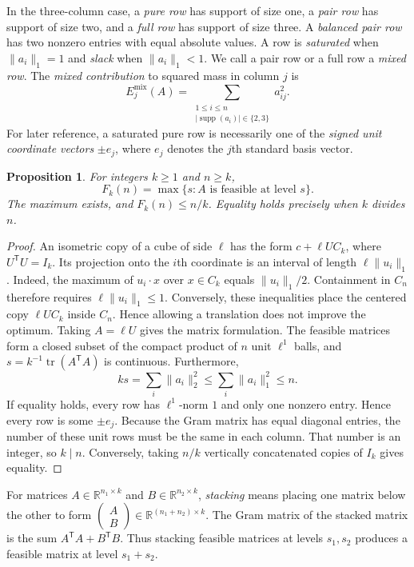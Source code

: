 \documentclass[11pt]{article}
\numberwithin{equation}{section}
\newtheorem{proposition}[proposition]{Proposition}
\theoremstyle{definition}
\theoremstyle{definition}
\newcommand{\R}{\mathbb R}
\newcommand{\norm}[1]{\lVert#1\rVert}
\DeclareMathOperator{\tr}{tr}
\DeclareMathOperator{\supp}{supp}
\begin{document}
In the three-column case, a \emph{pure row} has support of size one,
a \emph{pair row} has support of size two, and a \emph{full row}
has support of size three. A \emph{balanced pair row} has two
nonzero entries with equal absolute values. A row is
\emph{saturated} when $\|a_i\|_1=1$ and \emph{slack} when
$\|a_i\|_1<1$. We call a pair row or a full row a \emph{mixed row}.
The \emph{mixed contribution} to squared mass in column $j$ is
\[
 E_j^{\mathrm{mix}}(A)=
 \sum_{\substack{1\le i\le n\\|\supp(a_i)|\in\{2,3\}}}a_{ij}^2.
\]
For later reference, a saturated pure row is necessarily one of the
\emph{signed unit coordinate vectors} $\pm e_j$, where $e_j$ denotes
the $j$th standard basis vector.

\begin{proposition}\label{prop:matrix-model}
For integers $k\ge1$ and $n\ge k$,
\[
 F_k(n)=\max\{s:A\text{ is feasible at level }s\}.
\]
The maximum exists, and $F_k(n)\le n/k$. Equality holds precisely when
$k$ divides $n$.
\end{proposition}
\begin{proof}
An isometric copy of a cube of side $\ell$ has the form
$c+\ell U C_k$, where $U^{\mathsf T}U=I_k$.  Its projection onto the
$i$th coordinate is an interval of length $\ell\norm{u_i}_1$.
Indeed, the maximum of $u_i\cdot x$ over $x\in C_k$ equals
$\norm{u_i}_1/2$.  Containment in $C_n$ therefore requires
$\ell\norm{u_i}_1\le1$.  Conversely, these inequalities place the
centered copy $\ell U C_k$ inside $C_n$.  Hence allowing a translation
does not improve the optimum.  Taking $A=\ell U$ gives the matrix
formulation.
The feasible matrices form a closed subset of the compact product of
$n$ unit $\ell^1$ balls, and $s=k^{-1}\tr(A^{\mathsf T}A)$ is continuous.
Furthermore,
\[
 ks=\sum_i\norm{a_i}_2^2\le\sum_i\norm{a_i}_1^2\le n.
\]
If equality holds, every row has $\ell^1$-norm $1$ and only one nonzero
entry. Hence every row is some $\pm e_j$. Because the Gram matrix
has equal diagonal entries, the number of these unit rows must be
the same in each column. That number is an integer, so $k\mid n$.
Conversely, taking $n/k$ vertically concatenated copies of $I_k$
gives equality.
\end{proof}

For matrices $A\in\R^{n_1\times k}$ and $B\in\R^{n_2\times k}$,
\emph{stacking} means placing one matrix below the other to form
$\begin{pmatrix}A\\B\end{pmatrix}\in\R^{(n_1+n_2)\times k}$.
The Gram matrix of the stacked matrix is the sum
$A^{\mathsf T}A+B^{\mathsf T}B$. Thus stacking feasible matrices
at levels $s_1,s_2$ produces a feasible matrix at level $s_1+s_2$.
\end{document}
